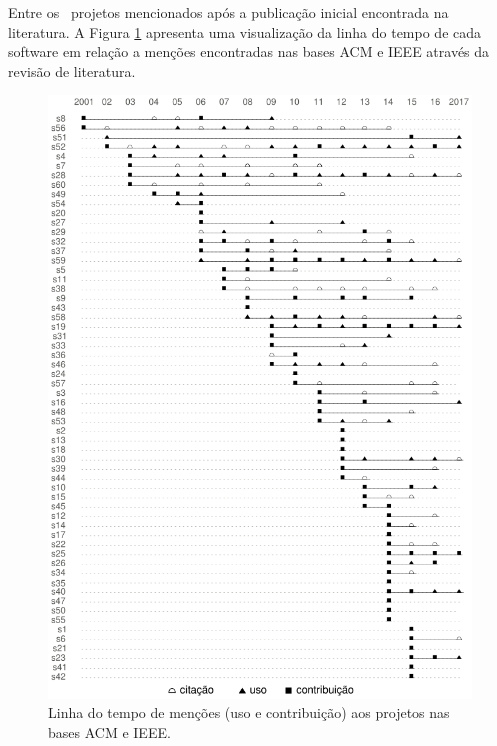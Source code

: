 Entre os \MentionsStudyDois \
projetos mencionados após a publicação inicial encontrada na literatura.
A Figura \ref{mentions-timeline} apresenta uma visualização da linha do tempo
de cada software em relação a menções encontradas nas bases ACM e IEEE através
da revisão de literatura.

\begin{figure}[h]
  \center
  \includegraphics[scale=0.6]{imagens/mentions-timeline.png}
  \caption{Linha do tempo de menções (uso e contribuição) aos projetos nas bases ACM e IEEE.}
  \label{mentions-timeline}
\end{figure}



